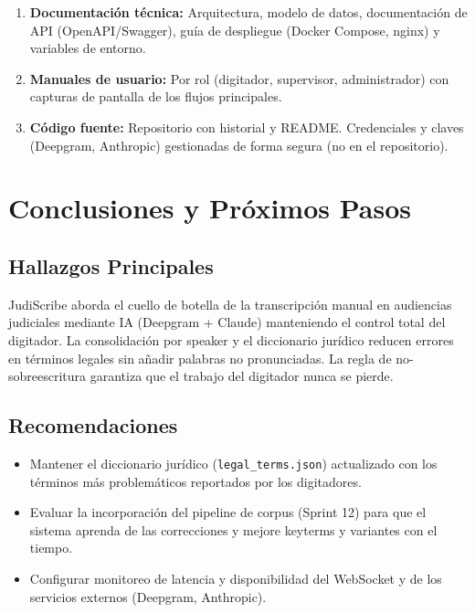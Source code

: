 \documentclass[12pt,a4paper]{report}
\begin{document}
\begin{enumerate}
    \item \textbf{Documentación técnica:} Arquitectura, modelo de datos, documentación de API (OpenAPI/Swagger), guía de despliegue (Docker Compose, nginx) y variables de entorno.
    \item \textbf{Manuales de usuario:} Por rol (digitador, supervisor, administrador) con capturas de pantalla de los flujos principales.
    \item \textbf{Código fuente:} Repositorio con historial y README. Credenciales y claves (Deepgram, Anthropic) gestionadas de forma segura (no en el repositorio).
\end{enumerate}

\chapter{Conclusiones y Próximos Pasos}

\section{Hallazgos Principales}

JudiScribe aborda el cuello de botella de la transcripción manual en audiencias judiciales mediante IA (Deepgram + Claude) manteniendo el control total del digitador. La consolidación por speaker y el diccionario jurídico reducen errores en términos legales sin añadir palabras no pronunciadas. La regla de no-sobreescritura garantiza que el trabajo del digitador nunca se pierde.

\section{Recomendaciones}

\begin{itemize}
    \item Mantener el diccionario jurídico (\texttt{legal\_terms.json}) actualizado con los términos más problemáticos reportados por los digitadores.
    \item Evaluar la incorporación del pipeline de corpus (Sprint 12) para que el sistema aprenda de las correcciones y mejore keyterms y variantes con el tiempo.
    \item Configurar monitoreo de latencia y disponibilidad del WebSocket y de los servicios externos (Deepgram, Anthropic).
\end{itemize}
\end{document}
